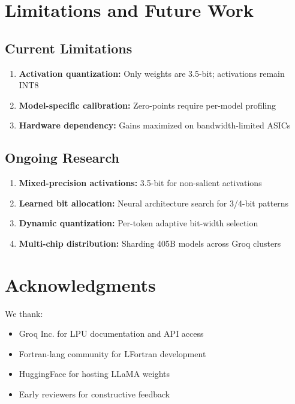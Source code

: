 \documentclass[10pt]{article}
\begin{document}
\section{Limitations and Future Work}

\subsection{Current Limitations}

\begin{enumerate}
\item \textbf{Activation quantization:} Only weights are 3.5-bit; activations remain INT8
\item \textbf{Model-specific calibration:} Zero-points require per-model profiling
\item \textbf{Hardware dependency:} Gains maximized on bandwidth-limited ASICs
\end{enumerate}

\subsection{Ongoing Research}

\begin{enumerate}
\item \textbf{Mixed-precision activations:} 3.5-bit for non-salient activations
\item \textbf{Learned bit allocation:} Neural architecture search for 3/4-bit patterns
\item \textbf{Dynamic quantization:} Per-token adaptive bit-width selection
\item \textbf{Multi-chip distribution:} Sharding 405B models across Groq clusters
\end{enumerate}

\section{Acknowledgments}

We thank:
\begin{itemize}
\item Groq Inc. for LPU documentation and API access
\item Fortran-lang community for LFortran development
\item HuggingFace for hosting LLaMA weights
\item Early reviewers for constructive feedback
\end{itemize}
\end{document}
